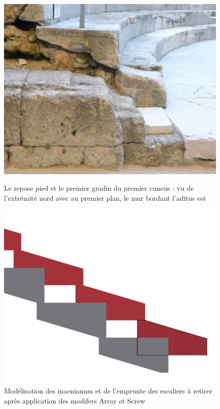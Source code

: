 \begin{figure}[!h] 
	\begin{subfigureth}{0.49\textwidth}
		\includegraphics[scale=0.37]{images/gradinCoupe}
		\caption[Repose pied et premier gradin du premier \gls{cuneus}]{Le repose pied et le premier gradin du premier \gls{cuneus} : vu de l'extrémité nord avec au premier plan, le mur bordant l'\gls{aditus} est} 
		\label{coupeGradin} 		
	\end{subfigureth}	
	\qquad
	\begin{subfigureth}{0.49\textwidth}
		\includegraphics[scale=0.22]{images/escaliers}
		\caption[Modélisation des \gls{maenianum}]{Modélisation des \gls{maenianum} et de l'emprunte des escaliers à retirer après application des modifers Array et Screw}
		\label{modelMaenianum} 		
	\end{subfigureth}	
\end{figure}

